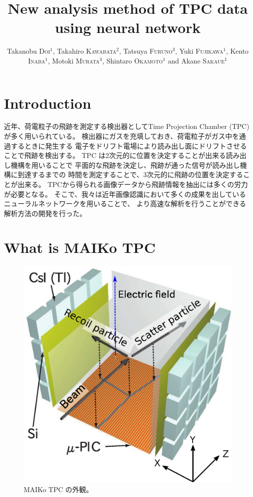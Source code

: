 \documentclass{jps-cp}
\title{New analysis method of TPC data using neural network}
\author{
  Takanobu \textsc{Doi}$^{1}$, Takahiro \textsc{Kawabata}$^{2}$, Tatsuya \textsc{Furuno}$^{3}$,
  Yuki \textsc{Fujikawa}$^{1}$, Kento \textsc{Inaba}$^{1}$, Motoki \textsc{Murata}$^{3}$,
  Shintaro \textsc{Okamoto}$^{1}$ and Akane \textsc{Sakaue}$^{1}$}
\begin{document}
\maketitle

\section{Introduction}
近年、荷電粒子の飛跡を測定する検出器としてTime Projection Chamber (TPC) が多く用いられている。
検出器にガスを充填しておき、荷電粒子がガス中を通過するときに発生する
電子をドリフト電場により読み出し面にドリフトさせることで飛跡を検出する。
TPC は2次元的に位置を決定することが出来る読み出し機構を用いることで
平面的な飛跡を決定し、飛跡が通った信号が読み出し機構に到達するまでの
時間を測定することで、3次元的に飛跡の位置を決定することが出来る。
TPCから得られる画像データから飛跡情報を抽出には多くの労力が必要となる。
そこで、我々は近年画像認識において多くの成果を出しているニューラルネットワークを用いることで、
より高速な解析を行うことができる解析方法の開発を行った。

\section{What is MAIKo TPC}

\begin{figure}
  \begin{center}
    \vspace{-2zw}
    \includegraphics[clip, width=12zw]{eps/MAIKo.eps}
    \caption{MAIKo TPC の外観。}
    \label{fig:MAIKo}
  \end{center}
\end{figure}
\end{document}
